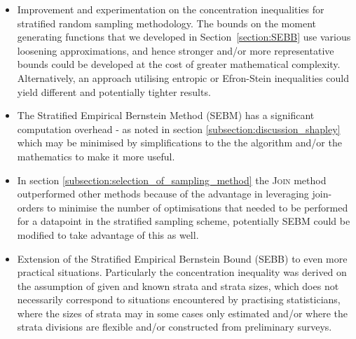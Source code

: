 \begin{itemize}
\item	Improvement and experimentation on the concentration inequalities for stratified random sampling methodology. The bounds on the moment generating functions that we developed in Section~\ref{section:SEBB} use various loosening approximations, and hence stronger and/or more representative bounds could be developed at the cost of greater mathematical complexity.
Alternatively, an approach utilising entropic \citep{Boucheron_concentrationinequalities} or Efron-Stein inequalities \citep{efron1981} could yield different and potentially tighter results.
\item	The Stratified Empirical Bernstein Method (SEBM) has a significant computation overhead - as noted in section \ref{subsection:discussion_shapley} which may be minimised by simplifications to the the algorithm and/or the mathematics to make it more useful.
\item	In section \ref{subsection:selection_of_sampling_method} the \textsc{Join} method outperformed other methods because of the advantage in leveraging join-orders to minimise the number of optimisations that needed to be performed for a datapoint in the stratified sampling scheme, potentially SEBM could be modified to take advantage of this as well.
\item	Extension of the Stratified Empirical Bernstein Bound (SEBB) to even more practical situations. Particularly the concentration inequality was derived on the assumption of given and known strata and strata sizes, which does not necessarily correspond to situations encountered by practising statisticians, where the sizes of strata may in some cases only estimated and/or where the strata divisions are flexible and/or constructed from preliminary surveys.
\end{itemize}


